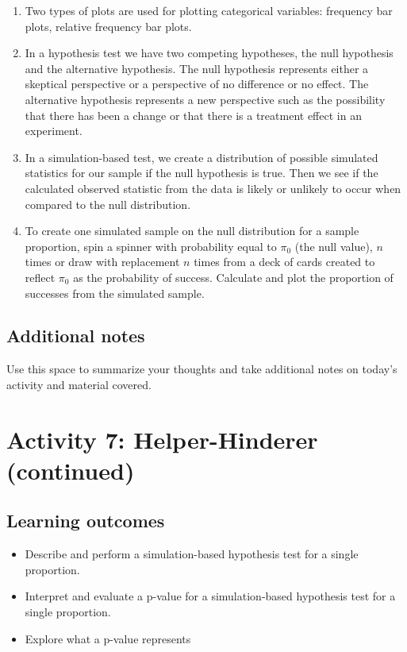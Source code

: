 \documentclass[
]{report}
\begin{document}
\begin{enumerate}
\def\labelenumi{\arabic{enumi}.}
\item
  Two types of plots are used for plotting categorical variables: frequency bar plots, relative frequency bar plots.
\item
  In a hypothesis test we have two competing hypotheses, the null hypothesis and the alternative hypothesis. The null hypothesis represents either a skeptical perspective or a perspective of no difference or no effect. The alternative hypothesis represents a new perspective such as the possibility that there has been a change or that there is a treatment effect in an experiment.
\item
  In a simulation-based test, we create a distribution of possible simulated statistics for our sample if the null hypothesis is true. Then we see if the calculated observed statistic from the data is likely or unlikely to occur when compared to the null distribution.
\item
  To create one simulated sample on the null distribution for a sample proportion, spin a spinner with probability equal to \(\pi_0\) (the null value), \(n\) times or draw with replacement \(n\) times from a deck of cards created to reflect \(\pi_0\) as the probability of success. Calculate and plot the proportion of successes from the simulated sample.
\end{enumerate}

\subsection{Additional notes}\label{additional-notes-5}

Use this space to summarize your thoughts and take additional notes on today's activity and material covered.

\newpage

\section{Activity 7: Helper-Hinderer (continued)}\label{activity-7-helper-hinderer-continued}


\subsection{Learning outcomes}\label{learning-outcomes-6}

\begin{itemize}
\item
  Describe and perform a simulation-based hypothesis test for a single proportion.
\item
  Interpret and evaluate a p-value for a simulation-based hypothesis test for a single proportion.
\item
  Explore what a p-value represents
\end{itemize}
\end{document}
